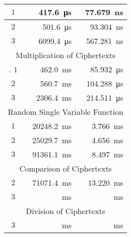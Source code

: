 \documentclass{article}
\begin{document}
\begin{center}
\begin{tabular}{| c | r | r |}
                $1$ & \SI{417.6}{\micro\second} & \SI{77.679}{\nano\second}
                \\ \hline
                $2$ & \SI{501.6}{\micro\second} & \SI{93.304}{\nano\second}
                \\ \hline
                $3$ & \SI{6099.4}{\micro\second} & \SI{567.281}{\nano\second}
                \\ \hline
                \multicolumn{3}{|c|}{Multiplication of Ciphertexts}
                \\ \hline.
                $1$ & \SI{462.0}{\milli\second} & \SI{85.932}{\micro\second}
                \\ \hline
                $2$ & \SI{560.7}{\milli\second} & \SI{104.288}{\micro\second}
                \\ \hline
                $3$ & \SI{2306.4}{\milli\second} & \SI{214.511}{\micro\second}
                \\ \hline
                \multicolumn{3}{|c|}{Random Single Variable Function}
                \\ \hline
                $1$ & \SI{20248.2}{\milli\second} & \SI{3.766}{\milli\second}
                \\ \hline
                $2$ & \SI{25029.7}{\milli\second} & \SI{4.656}{\milli\second}
                \\ \hline
                $3$ & \SI{91361.1}{\milli\second} & \SI{8.497}{\milli\second}
                \\ \hline
                \multicolumn{3}{|c|}{Comparison of Ciphertexts}
                \\ \hline
                $2$ & \SI{71071.4}{\milli\second} & \SI{13.220}{\milli\second}
                \\ \hline
                $3$ & \SI{}{\milli\second} & \SI{}{\milli\second}
                \\ \hline
                \multicolumn{3}{|c|}{Division of Ciphertexts}
                \\ \hline
                $3$ & \SI{}{\milli\second} & \SI{}{\milli\second}
                \\ \hline
            \end{tabular}
        \end{center}
\end{document}
